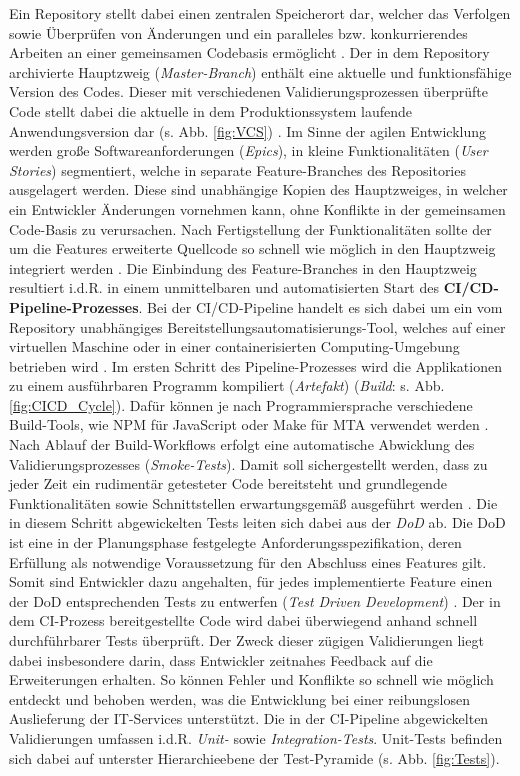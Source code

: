 \vspace*{-15mm}
Ein Repository stellt dabei einen zentralen Speicherort dar, welcher das Verfolgen sowie Überprüfen von Änderungen und ein paralleles bzw. konkurrierendes Arbeiten an einer gemeinsamen Codebasis ermöglicht \cite[1]{Blischak.2016}. Der in dem Repository archivierte Hauptzweig (\textit{Master-Branch}) enthält eine aktuelle und funktionsfähige Version des Codes. Dieser mit verschiedenen Validierungsprozessen überprüfte Code stellt dabei die aktuelle in dem Produktionssystem laufende Anwendungsversion dar (s. Abb. \ref{fig:VCS}) \cite[337]{Schmiedmayer.52220225242022}. Im Sinne der agilen Entwicklung werden große Softwareanforderungen (\textit{Epics}), in kleine Funktionalitäten (\textit{User Stories}) segmentiert, welche in separate Feature-Branches des Repositories ausgelagert werden. Diese sind unabhängige Kopien des Hauptzweiges, in welcher ein Entwickler Änderungen vornehmen kann, ohne Konflikte in der gemeinsamen Code-Basis zu verursachen. Nach Fertigstellung der Funktionalitäten sollte der um die Features erweiterte Quellcode so schnell wie möglich in den Hauptzweig integriert werden \cite[337]{Schmiedmayer.52220225242022}. Die Einbindung des Feature-Branches in den Hauptzweig resultiert i.d.R. in einem unmittelbaren und automatisierten Start des \textbf{CI/CD-Pipeline-Prozesses}. Bei der CI/CD-Pipeline handelt es sich dabei um ein vom Repository unabhängiges Bereitstellungsautomati\-sierungs-Tool, welches auf einer virtuellen Maschine oder in einer containerisierten Computing-Umgebung betrieben wird \cite{Codefresh.20230419}. Im ersten Schritt des Pipeline-Prozesses wird die Applikationen zu einem ausführbaren Programm kompiliert (\textit{Artefakt}) (\textit{Build}: s. Abb. \ref{fig:CICD_Cycle}). Dafür können je nach Programmiersprache verschiedene Build-Tools, wie NPM für JavaScript oder Make für \ac{MTA} verwendet werden \cite[737]{Lange.2023}. Nach Ablauf der Build-Workflows erfolgt eine automatische Abwicklung des Validierungsprozesses (\textit{Smoke-Tests}). Damit soll sichergestellt werden, dass zu jeder Zeit ein rudimentär getesteter Code bereitsteht und grundlegende Funktionalitäten sowie Schnittstellen erwartungsgemäß ausgeführt werden \cite[19]{Halstenberg.2020}. Die in diesem Schritt abgewickelten Tests leiten sich dabei aus der \textit{\ac{DoD}} ab. Die DoD ist eine in der Planungsphase festgelegte Anforderungsspezifikation, deren Erfüllung als notwendige Voraussetzung für den Abschluss eines Features gilt. Somit sind Entwickler dazu angehalten, für jedes implementierte Feature einen der DoD entsprechenden Tests zu entwerfen (\textit{Test Driven Development}) \cite{.20230419}. Der in dem CI-Prozess bereitgestellte Code wird dabei überwiegend anhand schnell durchführbarer Tests überprüft. Der Zweck dieser zügigen Validierungen liegt dabei insbesondere darin, dass Entwickler zeitnahes Feedback auf die Erweiterungen erhalten. So können Fehler und Konflikte so schnell wie möglich entdeckt und behoben werden, was die Entwicklung bei einer reibungslosen Auslieferung der IT-Services unterstützt. Die in der CI-Pipeline abgewickelten Validierungen umfassen i.d.R. \textit{Unit-} sowie \textit{Integration-Tests}. Unit-Tests befinden sich dabei auf unterster Hierarchieebene der Test-Pyramide (s. Abb. \ref{fig:Tests}).
